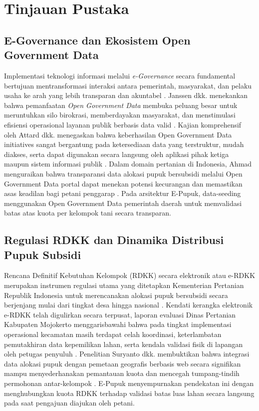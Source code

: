 \documentclass[conference]{IEEEtran}
\begin{document}
\section{Tinjauan Pustaka}
\subsection{E-Governance dan Ekosistem Open Government Data}
Implementasi teknologi informasi melalui \textit{e-Governance} secara fundamental bertujuan mentransformasi interaksi antara pemerintah, masyarakat, dan pelaku usaha ke arah yang lebih transparan dan akuntabel \cite{b1}. Janssen dkk. menekankan bahwa pemanfaatan \textit{Open Government Data} membuka peluang besar untuk meruntuhkan silo birokrasi, memberdayakan masyarakat, dan menstimulasi efisiensi operasional layanan publik berbasis data valid \cite{b2}. Kajian komprehensif oleh Attard dkk. menegaskan bahwa keberhasilan Open Government Data initiatives sangat bergantung pada ketersediaan data yang terstruktur, mudah diakses, serta dapat digunakan secara langsung oleh aplikasi pihak ketiga maupun sistem informasi publik \cite{b3}. Dalam domain pertanian di Indonesia, Ahmad menguraikan bahwa transparansi data alokasi pupuk bersubsidi melalui Open Government Data portal dapat menekan potensi kecurangan dan memastikan asas keadilan bagi petani penggarap \cite{b6}. Pada arsitektur E-Pupuk, data-seeding menggunakan Open Government Data pemerintah daerah untuk memvalidasi batas atas kuota per kelompok tani secara transparan.

\subsection{Regulasi RDKK dan Dinamika Distribusi Pupuk Subsidi}
Rencana Definitif Kebutuhan Kelompok (RDKK) secara elektronik atau e-RDKK merupakan instrumen regulasi utama yang ditetapkan Kementerian Pertanian Republik Indonesia untuk merencanakan alokasi pupuk bersubsidi secara berjenjang mulai dari tingkat desa hingga nasional \cite{b4}. Kendati kerangka elektronik e-RDKK telah digulirkan secara terpusat, laporan evaluasi Dinas Pertanian Kabupaten Mojokerto menggarisbawahi bahwa pada tingkat implementasi operasional kecamatan masih terdapat celah koordinasi, keterlambatan pemutakhiran data kepemilikan lahan, serta kendala validasi fisik di lapangan oleh petugas penyuluh \cite{b5}. Penelitian Suryanto dkk. membuktikan bahwa integrasi data alokasi pupuk dengan pemetaan geografis berbasis web secara signifikan mampu menyederhanakan pemantauan kuota dan mencegah tumpang-tindih permohonan antar-kelompok \cite{b7}. E-Pupuk menyempurnakan pendekatan ini dengan menghubungkan kuota RDKK terhadap validasi batas luas lahan secara langsung pada saat pengajuan diajukan oleh petani.
\end{document}
